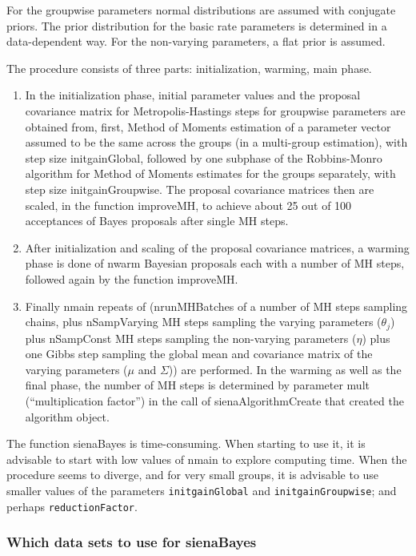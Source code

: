 \documentclass[a4paper,fleqn,11pt]{article}
\newcommand{\+}{\, + \,}
\newcommand{\sfn}[1]{\textsf{#1}}
\begin{document}
  For the groupwise parameters normal distributions are assumed with conjugate
  priors. The prior distribution for the basic rate parameters is determined
  in a data-dependent way. For the non-varying parameters,
  a flat prior is assumed.

  The procedure consists of three parts: initialization, warming,
  main phase.
  \begin{enumerate}
  \item
  In the initialization phase, initial parameter values and the proposal
  covariance matrix for Metropolis-Hastings steps for groupwise parameters
  are obtained from, first, Method of Moments estimation of a parameter vector
  assumed to be the same across the groups (in a multi-group estimation),
  with step size \sfn{initgainGlobal},
  followed by one subphase of the Robbins-Monro algorithm for Method of
  Moments estimates for the groups separately, with step size \sfn{initgainGroupwise}.
  The proposal covariance matrices then are scaled, in the
  function \sfn{improveMH}, to achieve about 25 out of 100 acceptances of
  Bayes proposals after single MH steps.
  \item
  After initialization and scaling of the proposal covariance matrices,
  a warming phase is done of \sfn{nwarm} Bayesian proposals
  each with a number of MH steps, followed again by the function \sfn{improveMH}.
  \item
  Finally \sfn{nmain} repeats of \big(\sfn{nrunMHBatches} of a
  number of MH steps sampling chains, plus \sfn{nSampVarying} MH steps
  sampling the varying parameters ($\theta_j$) plus \sfn{nSampConst} MH steps
  sampling the non-varying parameters ($\eta$) plus one Gibbs
  step sampling the global mean and covariance matrix of the varying parameters
  ($\mu$ and $\Sigma$)\big) are performed.
  In the warming as well as the final phase, the number of MH steps is
  determined by parameter \sfn{mult} (``multiplication factor'')
  in the call of \sfn{sienaAlgorithmCreate} that created the algorithm object.
\end{enumerate}
  The function \sfn{sienaBayes} is time-consuming. When starting to use it, it is advisable
  to start with low values of \sfn{nmain} to explore computing time.
  When the procedure seems to diverge, and for very small groups, it is
  advisable to use smaller values of the parameters \texttt{initgainGlobal}
  and \texttt{initgainGroupwise}; and perhaps \texttt{reductionFactor}.


\subsubsection{Which data sets to use for sienaBayes}
\label{S_sBData}
\end{document}

